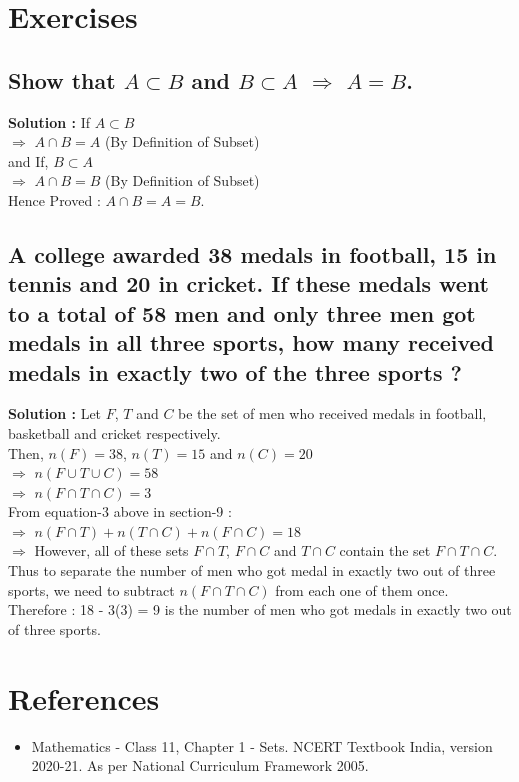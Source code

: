 \documentclass[12pt, letterpaper]{article}
\begin{document}
\section{Exercises}

\subsection{Show that $A \subset B$ and $B \subset A$ $\Rightarrow$ $A = B$.}
\textbf{Solution : }If $A \subset B$ \\
$\Rightarrow$ $A \cap B = A$ (By Definition of Subset) \\
and If, $B \subset A$ \\
$\Rightarrow$ $A \cap B = B$ (By Definition of Subset) \\
Hence Proved : $A \cap B = A = B$.

\subsection{A college awarded 38 medals in football, 15 in tennis and 20 in cricket. If these medals went to a total of 58 men and only three men got medals in all three sports, how many received medals in exactly two of the three sports ?}
\textbf{Solution : }Let $F$, $T$ and $C$ be the set of men who received medals in football, basketball and cricket respectively.\\
Then, $n(F) = 38$, $n(T) = 15$ and $n(C) = 20$\\
$\Rightarrow$ $n(F \cup T \cup C) = 58$ \\
$\Rightarrow$ $n(F \cap T \cap C) = 3$ \\ 
From equation-3 above in section-9 : \\
$\Rightarrow$ $n(F \cap T) + n(T \cap C) + n(F \cap C) = 18$ \\
$\Rightarrow$ However, all of these sets $F \cap T$, $F \cap C$ and $T \cap C$ contain the set $F \cap T \cap C$.\\ 
Thus to separate the number of men who got medal in exactly two out of three sports, we need to subtract $n(F \cap T \cap C)$ from each one of them once.\\
Therefore : 18 - 3(3) = 9 is the number of men who got medals in exactly two out of three sports.

\section{References}
\begin{itemize}
    \item Mathematics - Class 11, Chapter 1 - Sets. NCERT Textbook India, version 2020-21. As per National Curriculum Framework 2005. 
\end{itemize}
\end{document}
